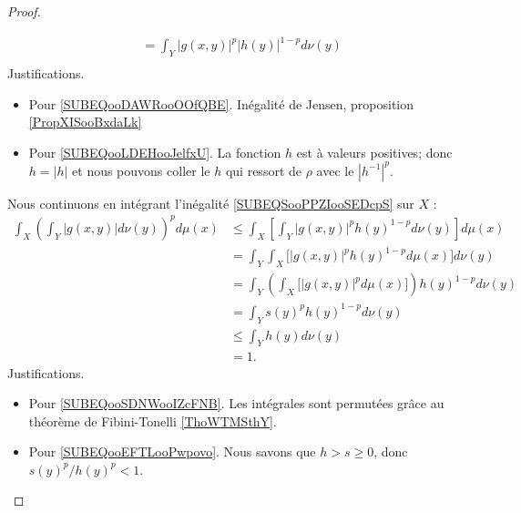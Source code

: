 \begin{proof}
\begin{subproof}
\begin{subequations}
\begin{align}
				                                       & =\int_Y| g(x,y) |^p| h(y) |^{1-p}d\nu(y)           \label{SUBEQooLDEHooJelfxU}           \\
			\end{align}
		\end{subequations}
		Justifications.
		\begin{itemize}
			\item Pour \eqref{SUBEQooDAWRooOOfQBE}. Inégalité de Jensen, proposition \ref{PropXISooBxdaLk}
			\item Pour \eqref{SUBEQooLDEHooJelfxU}. La fonction \( h\) est à valeurs positives; donc \( h=| h |\) et nous pouvons coller le \( h\) qui ressort de \( \rho\) avec le \( | h^{-1} |^p\).
		\end{itemize}
		Nous continuons en intégrant l'inégalité \eqref{SUBEQSooPPZIooSEDcpS} sur \( X\) :
		\begin{subequations}
			\begin{align}
				\int_X\left( \int_Y| g(x,y) |d\nu(y) \right)^pd\mu(x) & \leq\int_X\left[ \int_Y | g(x,y) |^ph(y)^{1-p}d\nu(y) \right]d\mu(x)                           \\
				                                                      & =\int_Y\int_X\big[ | g(x,y) |^ph(y)^{1-p}d\mu(x) \big]d\nu(y)      \label{SUBEQooSDNWooIZcFNB} \\
				                                                      & =\int_Y\left( \int_X\big[ | g(x,y) |^pd\mu(x) \big]\right)h(y)^{1-p}d\nu(y)                    \\
				                                                      & =\int_Y s(y)^ph(y)^{1-p}d\nu(y)                                                                \\
				                                                      & \leq \int_Yh(y)d\nu(y)     \label{SUBEQooEFTLooPwpovo}                                         \\
				                                                      & =1.
			\end{align}
		\end{subequations}
		Justifications.
		\begin{itemize}
			\item Pour \eqref{SUBEQooSDNWooIZcFNB}. Les intégrales sont permutées grâce au théorème de Fibini-Tonelli \ref{ThoWTMSthY}.
			\item Pour \eqref{SUBEQooEFTLooPwpovo}. Nous savons que \( h>s\geq 0\), donc \( s(y)^p/h(y)^p<1 \).
		\end{itemize}

\end{subproof}
\end{proof}
